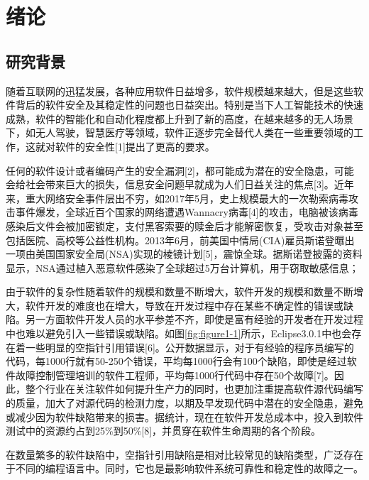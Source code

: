 \chapter{绪论}
\label{chap:intro}
\section{研究背景}

随着互联网的迅猛发展，各种应用软件日益增多，软件规模越来越大，但是这些软件背后的软件安全及其稳定性的问题也日益突出。特别是当下人工智能技术的快速成熟，软件的智能化和自动化程度都上升到了新的高度，在越来越多的无人场景下，如无人驾驶，智慧医疗等领域，软件正逐步完全替代人类在一些重要领域的工作，这就对软件的安全性[1]提出了更高的要求。

任何的软件设计或者编码产生的安全漏洞[2]，都可能成为潜在的安全隐患，可能会给社会带来巨大的损失，信息安全问题早就成为人们日益关注的焦点[3]。近年来，重大网络安全事件层出不穷，如2017年5月，史上规模最大的一次勒索病毒攻击事件爆发，全球近百个国家的网络遭遇Wannacry病毒[4]的攻击，电脑被该病毒感染后文件会被加密锁定，支付黑客索要的赎金后才能解密恢复，受攻击对象甚至包括医院、高校等公益性机构。2013年6月，前美国中情局(CIA)雇员斯诺登曝出一项由美国国家安全局(NSA)实现的棱镜计划[5]，震惊全球。据斯诺登披露的资料显示，NSA通过植入恶意软件感染了全球超过5万台计算机，用于窃取敏感信息；

由于软件的复杂性随着软件的规模和数量不断增大，软件开发的规模和数量不断增大，软件开发的难度也在增大，导致在开发过程中存在某些不确定性的错误或缺陷。另一方面软件开发人员的水平参差不齐，即使是富有经验的开发者在开发过程中也难以避免引入一些错误或缺陷。如图\ref{fig:figure1-1}所示，Eclipse3.0.1中也会存在着一些明显的空指针引用错误[6]。公开数据显示，对于有经验的程序员编写的代码，每1000行就有50-250个错误，平均每1000行会有100个缺陷，即使是经过软件故障控制管理培训的软件工程师，平均每1000行代码中存在50个故障[7]。因此，整个行业在关注软件如何提升生产力的同时，也更加注重提高软件源代码编写的质量，加大了对源代码的检测力度，以期及早发现代码中潜在的安全隐患，避免或减少因为软件缺陷带来的损害。据统计，现在在软件开发总成本中，投入到软件测试中的资源约占到25\%到50\%[8]，并贯穿在软件生命周期的各个阶段。

在数量繁多的软件缺陷中，空指针引用缺陷是相对比较常见的缺陷类型，广泛存在于不同的编程语言中。同时，它也是最影响软件系统可靠性和稳定性的故障之一。

